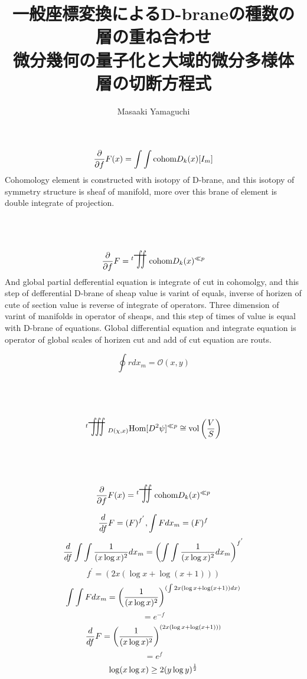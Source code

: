 \documentclass{jsarticle}
\begin{document}
\title{一般座標変換によるD-braneの種数の層の重ね合わせ \\
微分幾何の量子化と大域的微分多様体 \\
層の切断方程式}
\author{Masaaki Yamaguchi}
\date{}
\maketitle
\newcommand{\variint}{%
	\begin{picture}(15,30)
		\put(0,0){
			$ \iint $}
		\put(0,5){\line(15,0){15}}
	\end{picture} %
}

\newcommand{\variiint}{%
	\begin{picture}(20,30)
		\put(0,0){
			$ \iiint $}
		\put(0,5){\line(15,0){20}}
	\end{picture} %
}



 $$ {\partial \over \partial f}F(x) = \int \int \text{cohom}D_k(x)[I_m]  $$
 Cohomology element is constructed with isotopy of D-brane,
 and this isotopy of symmetry structure is sheaf of manifold,
 more over this brane of element is double integrate of projection.
 $$ {\partial \over \partial f}F = {{}^t {\scalebox{1}[2]{{\variint}}}}
 \text{cohom}D_k(x)^{\ll p} $$
 And global partial defferential equation is integrate of cut in cohomolgy,
 and this step of defferential D-brane of sheap value is varint of equals,
 inverse of horizen of cute of section value is reverse of integrate of 
 operators. Three dimension of varint of manifolds in operator of sheaps,
 and this step of times of value is equal with D-brane of equations.
 Global differential equation and integrate equation is operator of 
 global scales of horizen cut and add of cut equation are routs.

 $$ \oint r dx_m = \mathcal{O}(x,y) $$

 $$ {{}^t {\scalebox{1}[2]{{\variiint}}}}_{{D(\chi,x)}} \text{Hom}[D^2 \psi]
 ^{\ll p} \cong  \text{vol}\left({V \over S}\right) $$

 $$ {\partial \over \partial f}F(x) = {{}^t \scalebox{1}[2]{\variint}} 
 \text{cohom}D_k(x)^{\ll p} $$

 $$ {d \over df}F = (F)^{f^{'}}, \int F dx_m = (F)^{f}  $$
 $$ {d \over df}\int \int{1 \over (x \log x)^2}dx_m =
 \left(\int \int{1 \over (x \log x)^2}dx_m \right)^{f^{'}}  $$
 $$ f^{'} = (2x (\log x + \log (x + 1))) $$
  $$  \int \int F dx_m = \left({1 \over (x \log x)^2}\right)^{
	  (\int 2x (\log x + \log (x + 1))dx)} $$ 
   $$= e^{-f} $$
  $$ {d \over df}F = \left({1 \over (x \log x)^2}\right)^{
	  (2x (\log x + \log (x + 1))) } $$  
  $$= e^{f} $$
  $$ \log (x \log x) \ge 2(y \log y)^{1 \over 2} $$
\end{document}
